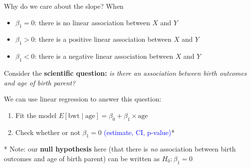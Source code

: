 \documentclass[10pt,t]{beamer}
\begin{document}
\begin{frame}{Why do we care about the slope?}
When
\begin{itemize}
	\item $\beta_1 = 0$: there is no linear association between $X$ and $Y$
	\item $\beta_1 > 0$: there is a positive linear association between $X$ and $Y$
	\item $\beta_1 < 0$: there is a negative linear association between $X$ and $Y$ \pause
\end{itemize}

\vspace{0.3cm}

Consider the \textbf{scientific question:} \textit{is there an association between birth outcomes and age of birth parent?}

\vspace{0.3cm}

We can use linear regression to answer this question:

\begin{enumerate}
	\item Fit the model $E[\text{bwt} \mid \text{age}] = \beta_0 + \beta_1 \times \text{age}$
	\item Check whether or not $\beta_1 = 0$ \textcolor{blue}{(estimate, CI, p-value)}*
\end{enumerate}

\vspace{0.3cm}

* Note: our \textbf{null hypothesis} here (that there is \textit{no} association between birth outcomes and age of birth parent) can be written as $H_0: \beta_1 = 0$

\end{frame}
\end{document}

